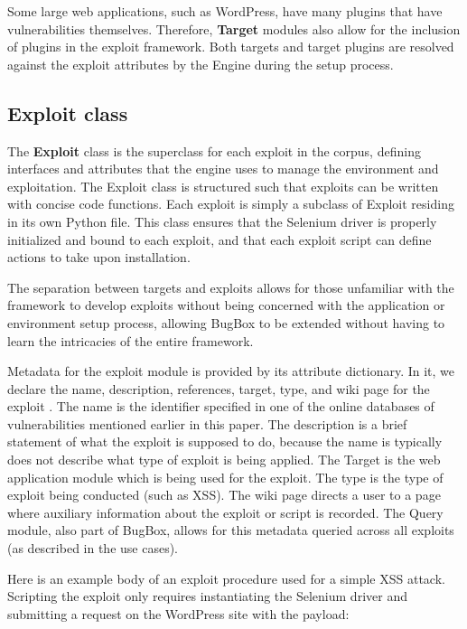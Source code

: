 \documentclass[letterpaper,twocolumn,10pt]{article}
\begin{document}
Some large web applications, such as WordPress, have many plugins that have vulnerabilities themselves. Therefore, {\bf Target} modules also allow for the inclusion of plugins in the exploit framework. Both targets and target plugins are resolved against the exploit attributes by the Engine during the setup process. 


\subsection{Exploit class}
The {\bf Exploit} class is the superclass for each exploit in the corpus, defining interfaces and attributes that the engine uses to manage the environment and exploitation. The Exploit class is structured such that exploits can be written with concise code functions. Each exploit is simply a subclass of Exploit residing in its own Python file. This class ensures that the Selenium driver is properly initialized and bound to each exploit, and that each exploit script can define actions to take upon installation.

The separation between targets and exploits allows for those unfamiliar with the framework to develop exploits without being concerned with the application or environment setup process, allowing BugBox to be extended without having to learn the intricacies of the entire framework.\par
 
Metadata for the exploit module is provided by its attribute dictionary. In it, we declare the name, description, references, target, type, and wiki page for the exploit .  The name is the identifier specified in one of the online databases of vulnerabilities mentioned earlier in this paper.  The description is a brief statement of what the exploit is supposed to do, because the name is typically does not describe what type of exploit is being applied.  The Target is the web application module which is being used for the exploit. The type is the type of exploit being conducted (such as XSS). The wiki page directs a user to a page where auxiliary information about the exploit or script is recorded. The Query module, also part of BugBox, allows for this metadata queried across all exploits (as described in the use cases).

Here is an example body of an exploit procedure used for a simple XSS attack. Scripting the exploit only requires instantiating the Selenium driver and submitting a request on the WordPress site with the payload: 
\end{document}
